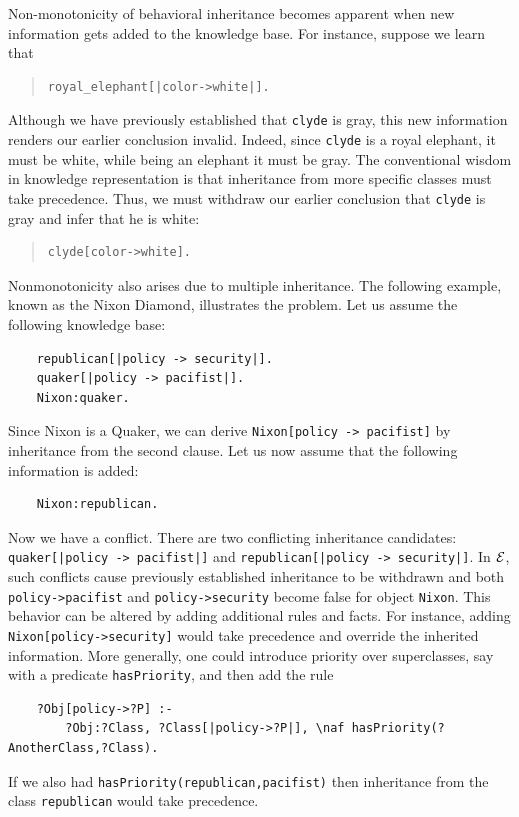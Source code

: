 \documentclass[11pt]{article}
\newcommand{\ERGO}{\mbox{\ensuremath{\cal{E}}\smaller{{\sc{RGO}}}}\xspace}
\newcommand{\FLSYSTEM}{\ERGO}
\begin{document}
Non-monotonicity of behavioral inheritance becomes apparent when new
information gets added to the knowledge base. For instance, suppose we
learn that
\begin{quote}
\begin{verbatim}
royal_elephant[|color->white|].  
\end{verbatim}
\end{quote}
Although we have previously established that {\tt clyde} is gray, this
new information renders our earlier conclusion invalid. Indeed, since
{\tt clyde} is a royal elephant, it must be white, while being an
elephant it must be gray.  The conventional wisdom in knowledge
representation is that inheritance from more specific classes
must take precedence. Thus, we must withdraw our earlier conclusion
that {\tt clyde} is gray and infer that he is white:
\begin{quote}
\begin{verbatim}
clyde[color->white].    
\end{verbatim}
\end{quote}

Nonmonotonicity also arises due to multiple inheritance. The following
example, known as the Nixon Diamond, illustrates the problem. Let us assume
the following knowledge base:
\begin{verbatim}
    republican[|policy -> security|].
    quaker[|policy -> pacifist|].
    Nixon:quaker.
\end{verbatim}
Since Nixon is a Quaker, we can derive {\tt Nixon[policy -> pacifist]}
by inheritance from the second clause. Let us now assume that the following
information is added:
\begin{verbatim}
    Nixon:republican.  
\end{verbatim}
Now we have a conflict. There are two conflicting inheritance candidates:
{\tt quaker[|policy -> pacifist|]} and {\tt republican[|policy ->
  security|]}.  In \FLSYSTEM, such conflicts cause previously
established inheritance to be withdrawn and both {\tt
  policy->pacifist} and \texttt{policy->security} 
become false for object {\tt Nixon}.  This behavior can be
altered by adding additional rules and facts. For instance, adding {\tt
  Nixon[policy->security]} would take precedence and override the
inherited information. More generally, one could introduce priority over
superclasses, say with a predicate {\tt hasPriority}, and then add the rule
\begin{verbatim}
    ?Obj[policy->?P] :-
        ?Obj:?Class, ?Class[|policy->?P|], \naf hasPriority(?AnotherClass,?Class).
\end{verbatim}
If we also had {\tt hasPriority(republican,pacifist)} then inheritance from
the class {\tt republican} would take precedence. 
\end{document}
